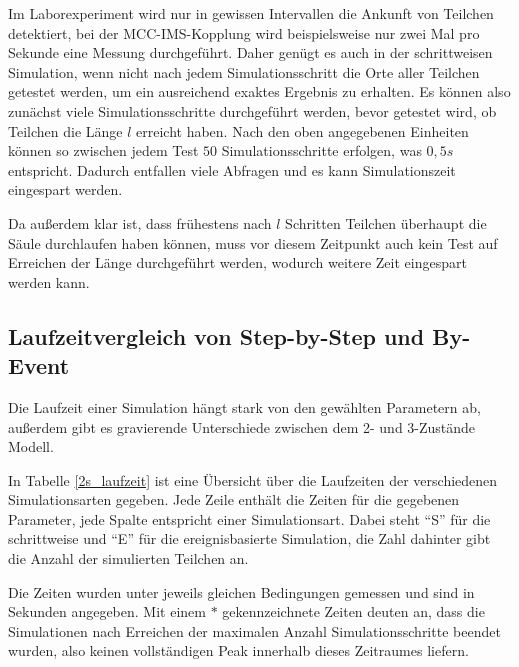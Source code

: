 Im Laborexperiment wird nur in gewissen Intervallen die Ankunft von Teilchen detektiert, bei der MCC-IMS-Kopplung wird beispielsweise nur zwei Mal pro Sekunde eine Messung durchgeführt. Daher genügt es auch in der schrittweisen Simulation, wenn nicht nach jedem Simulationsschritt die Orte aller Teilchen getestet werden, um ein ausreichend exaktes Ergebnis zu erhalten.
Es können also zunächst viele Simulationsschritte durchgeführt werden, bevor getestet wird, ob Teilchen die Länge $l$ erreicht haben. Nach den oben angegebenen Einheiten können so zwischen jedem Test $50$ Simulationsschritte erfolgen, was $0,5 s$ entspricht. Dadurch entfallen viele Abfragen und es kann Simulationszeit eingespart werden. 

Da außerdem klar ist, dass frühestens nach $l$ Schritten Teilchen überhaupt die Säule durchlaufen haben können, muss vor diesem Zeitpunkt auch kein Test auf Erreichen der Länge durchgeführt werden, wodurch weitere Zeit eingespart werden kann.


\subsection{Laufzeitvergleich von Step-by-Step und By-Event}

Die Laufzeit einer Simulation hängt stark von den gewählten Parametern ab, außerdem gibt es gravierende Unterschiede zwischen dem 2- und 3-Zustände Modell.

In Tabelle \ref{2s_laufzeit} ist eine Übersicht über die Laufzeiten der verschiedenen Simulationsarten gegeben. 
Jede Zeile enthält die Zeiten für die gegebenen Parameter, jede Spalte entspricht einer Simulationsart. Dabei steht ``S'' für die schrittweise und ``E'' für die ereignisbasierte Simulation, die Zahl dahinter gibt die Anzahl der simulierten Teilchen an.

Die Zeiten wurden unter jeweils gleichen Bedingungen gemessen und sind in Sekunden angegeben. 
Mit einem $*$ gekennzeichnete Zeiten deuten an, dass die Simulationen nach Erreichen der maximalen Anzahl Simulationsschritte beendet wurden, also keinen vollständigen Peak innerhalb dieses Zeitraumes liefern.


